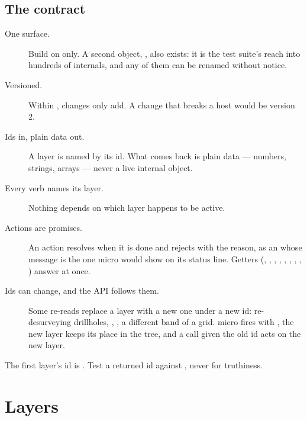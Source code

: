 \subsection{The contract}\label{sec:host-contract}

\begin{description}
\item[One surface.] Build on  only. A second object, ,
  also exists: it is the test suite's reach into hundreds of internals, and any of them can be
  renamed without notice.
\item[Versioned.] Within , changes only add. A change that breaks a host
  would be version 2.
\item[Ids in, plain data out.] A layer is named by its id. What comes back is plain data — numbers,
  strings, arrays — never a live internal object.
\item[Every verb names its layer.] Nothing depends on which layer happens to be active.
\item[Actions are promises.] An action resolves when it is done and rejects with the reason, as an
   whose message is the one micro would show on its status line. Getters
  (, , , , , ,
  , , ) answer at once.
\item[Ids can change, and the API follows them.] Some re-reads replace a layer with a new one under
  a new id: re-desurveying drillholes, , , a different
  band of a grid. micro fires  with , the new layer
  keeps its place in the tree, and a call given the old id acts on the new layer.
\end{description}

\begin{caution}
The first layer's id is . Test a returned id against , never for truthiness.
\end{caution}

\section{Layers}\label{sec:host-layers}


